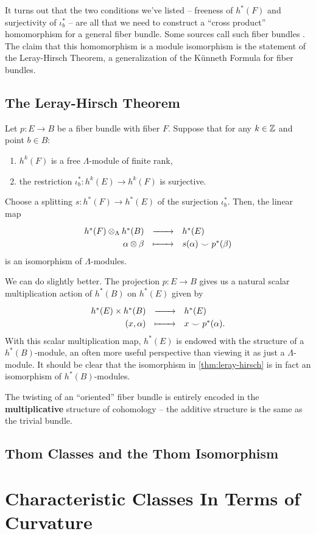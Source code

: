 It turns out that the two conditions we've listed -- freeness of $h^*(F)$ and surjectivity of $\iota_b^*$ -- are all that we need to construct a ``cross product'' homomorphism for a general fiber bundle. Some sources call such fiber bundles . The claim that this homomorphism is a module isomorphism is the statement of the Leray-Hirsch Theorem, a generalization of the K\"unneth Formula for fiber bundles.

\subsection{The Leray-Hirsch Theorem}

\begin{theorem}\label{thm:leray-hirsch} Let $p : E \to B$ be a fiber bundle with fiber $F$. Suppose that for any $k\in \mathbb{Z}$ and point $b\in B$:
	\begin{enumerate}
		\item $h^k(F)$ is a free $\Lambda$-module of finite rank,
		\item the restriction $\iota_b^* : h^k(E) \to h^k(F)$ is surjective.
	\end{enumerate}
	Choose a splitting $s : h^*(F) \to h^*(E)$ of the surjection $\iota_b^*$. Then, the linear map
	\[
		\definefunction{}{h^*(F)\otimes_\Lambda h^*(B)}{h^*(E)}{\alpha\otimes \beta}{s(\alpha)\smile p^*(\beta)}
	\]
	is an isomorphism of $\Lambda$-modules.
\end{theorem}

We can do slightly better. The projection $p : E \to B$ gives us a natural scalar multiplication action of $h^*(B)$ on $h^*(E)$ given by
\[
	\definefunction{}{h^*(E)\times h^*(B)}{h^*(E)}{(x, \alpha)}{x\smile p^*(\alpha).}
\]
With this scalar multiplication map, $h^*(E)$ is endowed with the structure of a $h^*(B)$-module, an often more useful perspective than viewing it as just a $\Lambda$-module. It should be clear that the isomorphism in \cref{thm:leray-hirsch} is in fact an isomorphism of $h^*(B)$-modules.


\begin{insight}
	The twisting of an ``oriented'' fiber bundle is entirely encoded in the \textbf{multiplicative} structure of cohomology -- the additive structure is the same as the trivial bundle.
\end{insight}

\subsection{Thom Classes and the Thom Isomorphism}

\section{Characteristic Classes In Terms of Curvature}
